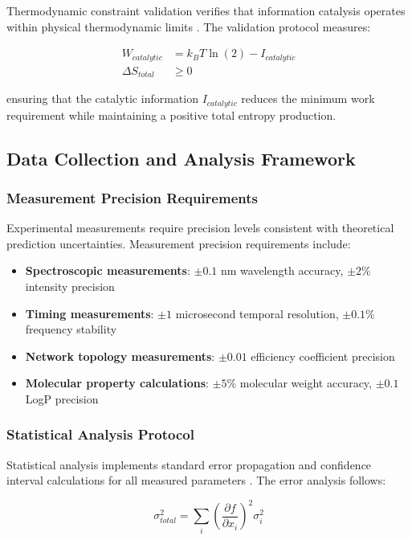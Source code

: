 \documentclass[12pt,a4paper]{article}
\begin{document}
Thermodynamic constraint validation verifies that information catalysis operates within physical thermodynamic limits \cite{landauer1961irreversibility}. The validation protocol measures:

\begin{align}
W_{catalytic} &= k_B T \ln(2) - I_{catalytic} \\
\Delta S_{total} &\geq 0
\end{align}

ensuring that the catalytic information $I_{catalytic}$ reduces the minimum work requirement while maintaining a positive total entropy production.

\subsection{Data Collection and Analysis Framework}

\subsubsection{Measurement Precision Requirements}

Experimental measurements require precision levels consistent with theoretical prediction uncertainties. Measurement precision requirements include:

\begin{itemize}
\item \textbf{Spectroscopic measurements}: $\pm 0.1$ nm wavelength accuracy, $\pm 2\%$ intensity precision
\item \textbf{Timing measurements}: $\pm 1$ microsecond temporal resolution, $\pm 0.1\%$ frequency stability
\item \textbf{Network topology measurements}: $\pm 0.01$ efficiency coefficient precision
\item \textbf{Molecular property calculations}: $\pm 5\%$ molecular weight accuracy, $\pm 0.1$ LogP precision
\end{itemize}

\subsubsection{Statistical Analysis Protocol}

Statistical analysis implements standard error propagation and confidence interval calculations for all measured parameters \cite{sears2003university}. The error analysis follows:

\begin{equation}
\sigma_{total}^2 = \sum_i \left(\frac{\partial f}{\partial x_i}\right)^2 \sigma_i^2
\end{equation}
\end{document}
